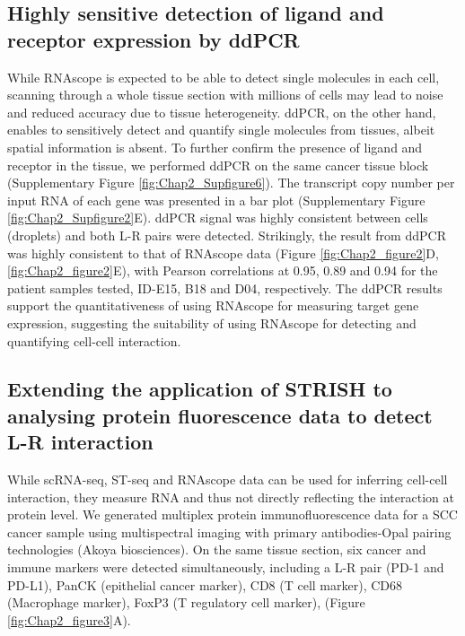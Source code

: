\subsection{Highly sensitive detection of ligand and receptor expression by ddPCR}
While RNAscope is expected to be able to detect single molecules in each cell, scanning through a whole tissue section with millions of cells may lead to noise and reduced accuracy due to tissue heterogeneity. ddPCR, on the other hand, enables to sensitively detect and quantify single molecules from tissues, albeit spatial information is absent. To further confirm the presence of ligand and receptor in the tissue, we performed ddPCR on the same cancer tissue block (Supplementary Figure  \ref{fig:Chap2_Supfigure6}). The transcript copy number per input RNA of each gene was presented in a bar plot (Supplementary Figure \ref{fig:Chap2_Supfigure2}E). ddPCR signal was highly consistent between cells (droplets) and both L-R pairs were detected. Strikingly, the result from ddPCR was highly consistent to that of RNAscope data (Figure \ref{fig:Chap2_figure2}D, \ref{fig:Chap2_figure2}E), with Pearson correlations at 0.95, 0.89 and 0.94 for the patient samples tested, ID-E15, B18 and D04, respectively. The ddPCR results support the quantitativeness of using RNAscope for measuring target gene expression, suggesting the suitability of using RNAscope for detecting and quantifying cell-cell interaction. 

\subsection{Extending the application of STRISH to analysing protein fluorescence data to detect L-R interaction}
While scRNA-seq, ST-seq and RNAscope data can be used for inferring cell-cell interaction, they measure RNA and thus not directly reflecting the interaction at protein level. We generated multiplex protein immunofluorescence data for a SCC cancer sample using multispectral imaging with primary antibodies-Opal pairing technologies (Akoya biosciences). On the same tissue section, six cancer and immune markers were detected simultaneously, including a L-R pair (PD-1 and PD-L1), PanCK (epithelial cancer marker), CD8 (T cell marker), CD68 (Macrophage marker), FoxP3 (T regulatory cell marker), (Figure \ref{fig:Chap2_figure3}A). 

